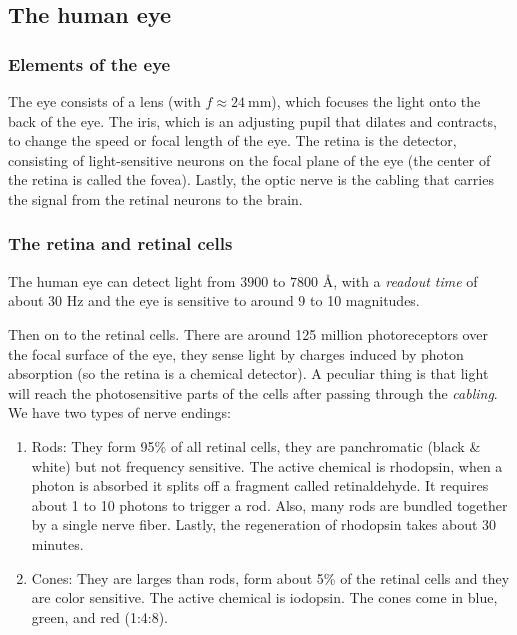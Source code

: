 \documentclass[a4paper]{article}
\begin{document}
\subsection{The human eye}

\subsubsection*{Elements of the eye}

The eye consists of a lens (with $f\approx 24\ \si{\milli\meter}$), which focuses the light onto the back of the eye. The iris, which is an adjusting pupil that dilates and contracts, to change the speed or focal length of the eye. The retina is the detector, consisting of light-sensitive neurons on the focal plane of the eye (the center of the retina is called the fovea). Lastly, the optic nerve is the cabling that carries the signal from the retinal neurons to the brain.

\subsubsection*{The retina and retinal cells}

The human eye can detect light from $3900$ to $7800$ \si{\angstrom}, with a \textit{readout time} of about 30 \si{\hertz} and the eye is sensitive to around 9 to 10 magnitudes.

\bigskip

Then on to the retinal cells. There are around 125 million photoreceptors over the focal surface of the eye, they sense light by charges induced by photon absorption (so the retina is a chemical detector). A peculiar thing is that light will reach the photosensitive parts of the cells after passing through the \textit{cabling}. We have two types of nerve endings:

\begin{enumerate}
    \item Rods: They form 95\% of all retinal cells, they are panchromatic (black \& white) but not frequency sensitive. The active chemical is rhodopsin, when a photon is absorbed it splits off a fragment called retinaldehyde. It requires about 1 to 10 photons to trigger a rod. Also, many rods are bundled together by a single nerve fiber. Lastly, the regeneration of rhodopsin takes about 30 minutes.
    \item Cones: They are larges than rods, form about 5\% of the retinal cells and they are color sensitive. The active chemical is iodopsin. The cones come in blue, green, and red (1:4:8).
\end{enumerate}
\end{document}
